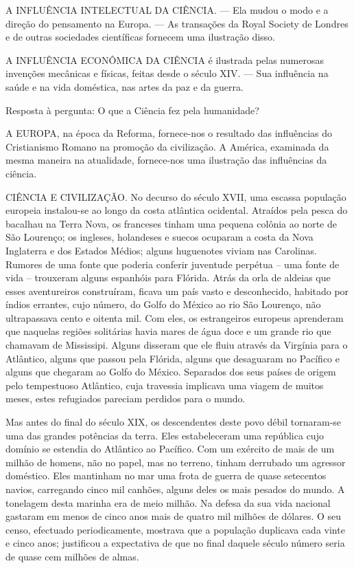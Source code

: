 \documentclass[11pt,a5paper,twoside,openany]{book}
\begin{document}
A INFLUÊNCIA INTELECTUAL DA CIÊNCIA. — Ela mudou o modo e a direção do pensamento na Europa. — As transações da Royal Society de Londres e de outras sociedades científicas fornecem uma ilustração disso.

A INFLUÊNCIA ECONÔMICA DA CIÊNCIA é ilustrada pelas numerosas invenções mecânicas e físicas, feitas desde o século XIV. — Sua influência na saúde e na vida doméstica, nas artes da paz e da guerra.

Resposta à pergunta: O que a Ciência fez pela humanidade?

A EUROPA, na época da Reforma, fornece-nos o resultado das influências do Cristianismo Romano na promoção da civilização. A América, examinada da mesma maneira na atualidade, fornece-nos uma ilustração das influências da ciência.

CIÊNCIA E CIVILIZAÇÃO. No decurso do século XVII, uma escassa população europeia instalou-se ao longo da costa atlântica ocidental. Atraídos pela pesca do bacalhau na Terra Nova, os franceses tinham uma pequena colônia ao norte de São Lourenço; os ingleses, holandeses e suecos ocuparam a costa da Nova Inglaterra e dos Estados Médios; alguns huguenotes viviam nas Carolinas. Rumores de uma fonte que poderia conferir juventude perpétua – uma fonte de vida – trouxeram alguns espanhóis para Flórida. Atrás da orla de aldeias que esses aventureiros construíram, ficava um país vasto e desconhecido, habitado por índios errantes, cujo número, do Golfo do México ao rio São Lourenço, não ultrapassava cento e oitenta mil. Com eles, os estrangeiros europeus aprenderam que naquelas regiões solitárias havia mares de água doce e um grande rio que chamavam de Mississipi. Alguns disseram que ele fluiu através da Virgínia para o Atlântico, alguns que passou pela Flórida, alguns que desaguaram no Pacífico e alguns que chegaram ao Golfo do México. Separados dos seus países de origem pelo tempestuoso Atlântico, cuja travessia implicava uma viagem de muitos meses, estes refugiados pareciam perdidos para o mundo.

Mas antes do final do século XIX, os descendentes deste povo débil tornaram-se uma das grandes potências da terra. Eles estabeleceram uma república cujo domínio se estendia do Atlântico ao Pacífico. Com um exército de mais de um milhão de homens, não no papel, mas no terreno, tinham derrubado um agressor doméstico. Eles mantinham no mar uma frota de guerra de quase setecentos navios, carregando cinco mil canhões, alguns deles os mais pesados ​​do mundo. A tonelagem desta marinha era de meio milhão. Na defesa da sua vida nacional gastaram em menos de cinco anos mais de quatro mil milhões de dólares. O seu censo, efectuado periodicamente, mostrava que a população duplicava cada vinte e cinco anos; justificou a expectativa de que no final daquele século número seria de quase cem milhões de almas.
\end{document}
